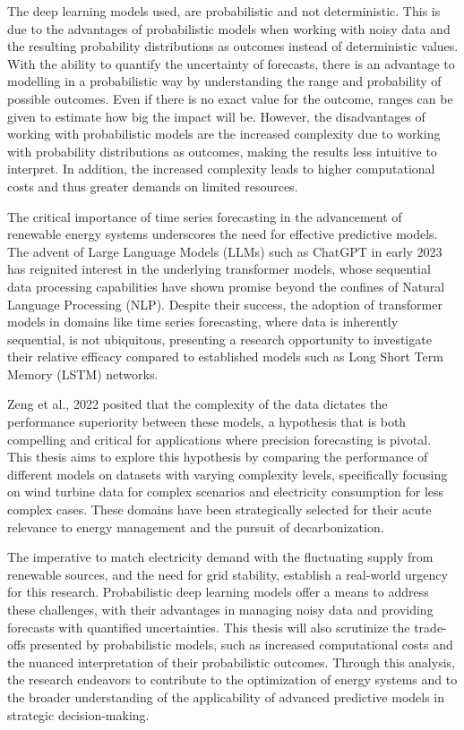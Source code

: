 \documentclass{article}
\begin{document}
The deep learning models used, are probabilistic and not deterministic. This is due to the advantages of probabilistic models when working with noisy data and the resulting probability distributions as outcomes instead of deterministic values. With the ability to quantify the uncertainty of forecasts, there is an advantage to modelling in a probabilistic way by understanding the range and probability of possible outcomes. Even if there is no exact value for the outcome, ranges can be given to estimate how big the impact will be.
However, the disadvantages of working with probabilistic models are the increased complexity due to working with probability distributions as outcomes, making the results less intuitive to interpret. In addition, the increased complexity leads to higher computational costs and thus greater demands on limited resources.

The critical importance of time series forecasting in the advancement of renewable energy systems underscores the need for effective predictive models. The advent of Large Language Models (LLMs) such as ChatGPT in early 2023 has reignited interest in the underlying transformer models, whose sequential data processing capabilities have shown promise beyond the confines of Natural Language Processing (NLP). Despite their success, the adoption of transformer models in domains like time series forecasting, where data is inherently sequential, is not ubiquitous, presenting a research opportunity to investigate their relative efficacy compared to established models such as Long Short Term Memory (LSTM) networks.

Zeng et al., 2022 posited that the complexity of the data dictates the performance superiority between these models, a hypothesis that is both compelling and critical for applications where precision forecasting is pivotal. This thesis aims to explore this hypothesis by comparing the performance of different models on datasets with varying complexity levels, specifically focusing on wind turbine data for complex scenarios and electricity consumption for less complex cases. These domains have been strategically selected for their acute relevance to energy management and the pursuit of decarbonization.

The imperative to match electricity demand with the fluctuating supply from renewable sources, and the need for grid stability, establish a real-world urgency for this research. Probabilistic deep learning models offer a means to address these challenges, with their advantages in managing noisy data and providing forecasts with quantified uncertainties. This thesis will also scrutinize the trade-offs presented by probabilistic models, such as increased computational costs and the nuanced interpretation of their probabilistic outcomes. Through this analysis, the research endeavors to contribute to the optimization of energy systems and to the broader understanding of the applicability of advanced predictive models in strategic decision-making.
\end{document}
